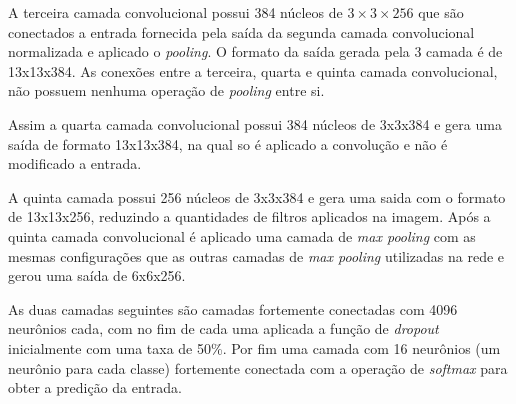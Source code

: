\par A terceira camada convolucional possui 384 núcleos de $3\times3\times256$ que são conectados a entrada fornecida pela saída da segunda camada convolucional normalizada e aplicado o \textit{pooling}. O formato da saída gerada pela 3 camada é de 13x13x384. As conexões entre a terceira, quarta e quinta camada convolucional, não possuem nenhuma operação de \textit{pooling} entre si. 
\par Assim a quarta camada convolucional possui 384 núcleos de 3x3x384 e gera uma saída de formato 13x13x384, na qual so é aplicado a convolução e não é modificado a entrada.
\par A quinta camada possui 256 núcleos de 3x3x384 e gera uma saida com o formato de 13x13x256, reduzindo a quantidades de filtros aplicados na imagem. Após a quinta camada convolucional é aplicado uma camada de \textit{max pooling} com as mesmas configurações que as outras camadas de \textit{max pooling} utilizadas na rede e gerou uma saída de 6x6x256.
\par As duas camadas seguintes são camadas fortemente conectadas com 4096 neurônios cada, com no fim de cada uma aplicada a função de \textit{dropout} inicialmente com uma taxa de 50\%. Por fim uma camada com 16 neurônios (um neurônio para cada classe) fortemente conectada com a operação de \textit{softmax} para obter a predição da entrada.

